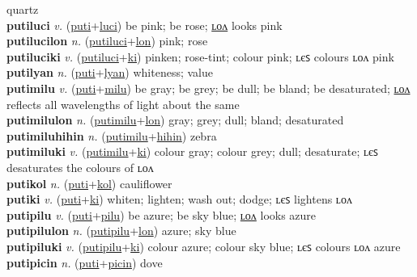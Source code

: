 quartz \label{putilonkiolon} \\
\textbf{putiluci} \textit{v.} (\hyperref[puti]{puti}+\hyperref[luci]{luci})
be pink; be rose; \hyperref[putilucilon]{ʟᴏᴧ} looks pink \label{putiluci} \\
\textbf{putilucilon} \textit{n.} (\hyperref[putiluci]{putiluci}+\hyperref[lon]{lon})
pink; rose \label{putilucilon} \\
\textbf{putiluciki} \textit{v.} (\hyperref[putiluci]{putiluci}+\hyperref[ki]{ki})
pinken; rose-tint; colour pink; ʟєꜱ colours ʟᴏᴧ pink \label{putiluciki} \\
\textbf{putilyan} \textit{n.} (\hyperref[puti]{puti}+\hyperref[lyan]{lyan})
whiteness; value \label{putilyan} \\
\textbf{putimilu} \textit{v.} (\hyperref[puti]{puti}+\hyperref[milu]{milu})
be gray; be grey; be dull; be bland; be desaturated; \hyperref[putimilulon]{ʟᴏᴧ} reflects all wavelengths of light about the same \label{putimilu} \\
\textbf{putimilulon} \textit{n.} (\hyperref[putimilu]{putimilu}+\hyperref[lon]{lon})
gray; grey; dull; bland; desaturated \label{putimilulon} \\
\textbf{putimiluhihin} \textit{n.} (\hyperref[putimilu]{putimilu}+\hyperref[hihin]{hihin})
zebra \label{putimiluhihin} \\
\textbf{putimiluki} \textit{v.} (\hyperref[putimilu]{putimilu}+\hyperref[ki]{ki})
colour gray; colour grey; dull; desaturate; ʟєꜱ desaturates the colours of ʟᴏᴧ \label{putimiluki} \\
\textbf{putikol} \textit{n.} (\hyperref[puti]{puti}+\hyperref[kol]{kol})
cauliflower \label{putikol} \\
\textbf{putiki} \textit{v.} (\hyperref[puti]{puti}+\hyperref[ki]{ki})
whiten; lighten; wash out; dodge; ʟєꜱ lightens ʟᴏᴧ \label{putiki} \\
\textbf{putipilu} \textit{v.} (\hyperref[puti]{puti}+\hyperref[pilu]{pilu})
be azure; be sky blue; \hyperref[putipilulon]{ʟᴏᴧ} looks azure \label{putipilu} \\
\textbf{putipilulon} \textit{n.} (\hyperref[putipilu]{putipilu}+\hyperref[lon]{lon})
azure; sky blue \label{putipilulon} \\
\textbf{putipiluki} \textit{v.} (\hyperref[putipilu]{putipilu}+\hyperref[ki]{ki})
colour azure; colour sky blue; ʟєꜱ colours ʟᴏᴧ azure \label{putipiluki} \\
\textbf{putipicin} \textit{n.} (\hyperref[puti]{puti}+\hyperref[picin]{picin})
dove \label{putipicin} \\
